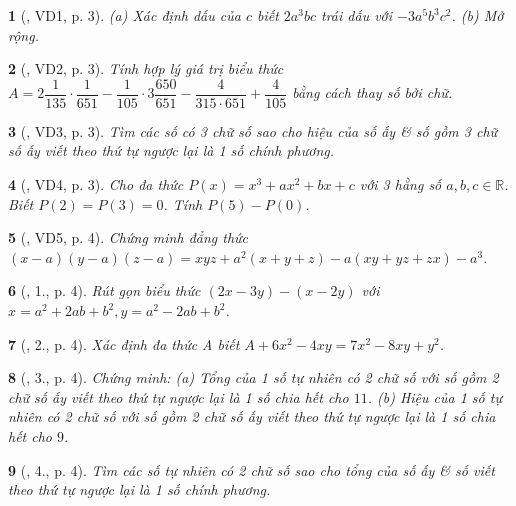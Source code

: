 \documentclass{article}
\newtheorem{baitoan}{}
\begin{document}
\begin{baitoan}[\cite{Binh_Toan_8_tap_1}, VD1, p. 3]
	(a) Xác định dấu của $c$ biết $2a^3bc$ trái dấu với $-3a^5b^3c^2$. (b) Mở rộng.
\end{baitoan}

\begin{baitoan}[\cite{Binh_Toan_8_tap_1}, VD2, p. 3]
	Tính hợp lý giá trị biểu thức $A = 2\dfrac{1}{135}\cdot\dfrac{1}{651} - \dfrac{1}{105}\cdot3\dfrac{650}{651} - \dfrac{4}{315\cdot651} + \dfrac{4}{105}$ bằng cách thay số bởi chữ.
\end{baitoan}

\begin{baitoan}[\cite{Binh_Toan_8_tap_1}, VD3, p. 3]
	Tìm các số có 3 chữ số sao cho hiệu của số ấy \& số gồm 3 chữ số ấy viết theo thứ tự ngược lại là 1 số chính phương.
\end{baitoan}

\begin{baitoan}[\cite{Binh_Toan_8_tap_1}, VD4, p. 3]
	Cho đa thức $P(x) = x^3 + ax^2 + bx + c$ với 3 hằng số $a,b,c\in\mathbb{R}$. Biết $P(2) = P(3) = 0$. Tính $P(5) - P(0)$.
\end{baitoan}

\begin{baitoan}[\cite{Binh_Toan_8_tap_1}, VD5, p. 4]
	Chứng minh đẳng thức $(x - a)(y - a)(z - a) = xyz + a^2(x + y + z) - a(xy + yz + zx) - a^3$.
\end{baitoan}

\begin{baitoan}[\cite{Binh_Toan_8_tap_1}, 1., p. 4]
	Rút gọn biểu thức $(2x - 3y) - (x - 2y)$ với $x = a^2 + 2ab + b^2,y = a^2 - 2ab + b^2$.
\end{baitoan}

\begin{baitoan}[\cite{Binh_Toan_8_tap_1}, 2., p. 4]
	Xác định đa thức A biết $A + 6x^2 - 4xy = 7x^2 - 8xy + y^2$.
\end{baitoan}

\begin{baitoan}[\cite{Binh_Toan_8_tap_1}, 3., p. 4]
	Chứng minh: (a) Tổng của 1 số tự nhiên có 2 chữ số với số gồm 2 chữ số ấy viết theo thứ tự ngược lại là 1 số chia hết cho $11$. (b) Hiệu của 1 số tự nhiên có 2 chữ số với số gồm 2 chữ số ấy viết theo thứ tự ngược lại là 1 số chia hết cho $9$.
\end{baitoan}

\begin{baitoan}[\cite{Binh_Toan_8_tap_1}, 4., p. 4]
	Tìm các số tự nhiên có 2 chữ số sao cho tổng của số ấy \& số viết theo thứ tự ngược lại là 1 số chính phương.
\end{baitoan}
\end{document}
